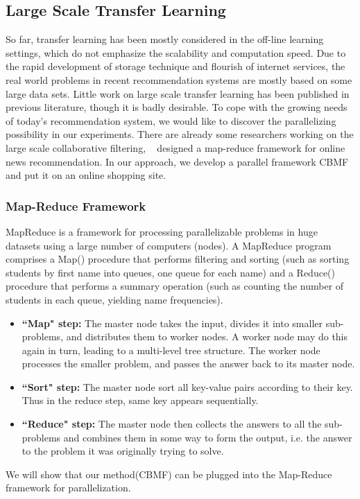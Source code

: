 \subsection{Large Scale Transfer Learning}
So far, transfer learning has been mostly considered in the off-line learning settings, which do not emphasize the scalability and computation speed. Due to the rapid development of storage technique and flourish of internet services, the real world problems in recent recommendation systems are mostly based on some large data sets. Little work on large scale transfer learning has been published in previous literature, though it is badly desirable. To cope with the growing needs of today's recommendation system, we would like to discover the parallelizing possibility in our experiments. There are already some researchers working on the large scale collaborative filtering, ~\cite{das2007google} designed a map-reduce framework for online news recommendation. In our approach, we develop a parallel framework CBMF and put it on an online shopping site.

\hspace{0.02in}
\subsubsection{Map-Reduce Framework}
MapReduce is a framework for processing parallelizable problems in huge datasets using a large number of computers (nodes). A MapReduce program comprises a Map() procedure that performs filtering and sorting (such as sorting students by first name into queues, one queue for each name) and a Reduce() procedure that performs a summary operation (such as counting the number of students in each queue, yielding name frequencies).
\begin{itemize}
\item {\bf ``Map" step:} The master node takes the input, divides it into smaller sub-problems, and distributes them to worker nodes. A worker node may do this again in turn, leading to a multi-level tree structure. The worker node processes the smaller problem, and passes the answer back to its master node.
\item {\bf ``Sort" step:} The master node sort all key-value pairs according to their key. Thus in the reduce step, same key appears sequentially.
\item {\bf ``Reduce" step:} The master node then collects the answers to all the sub-problems and combines them in some way to form the output, i.e. the answer to the problem it was originally trying to solve.
\end{itemize}
We will show that our method(CBMF) can be plugged into the Map-Reduce framework for parallelization.





